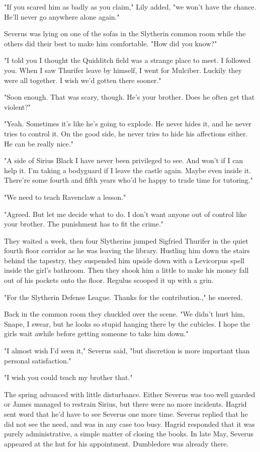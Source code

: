"If you scared him as badly as you claim," Lily added, "we won't have the chance. He'll never go anywhere alone again."

Severus was lying on one of the sofas in the Slytherin common room while the others did their best to make him comfortable. "How did you know?"

"I told you I thought the Quidditch field was a strange place to meet. I followed you. When I saw Thurifer leave by himself, I went for Mulciber. Luckily they were all together. I wish we'd gotten there sooner."

"Soon enough. That was scary, though. He's your brother. Does he often get that violent?"

"Yeah. Sometimes it's like he's going to explode. He never hides it, and he never tries to control it. On the good side, he never tries to hide his affections either. He can be really nice."

"A side of Sirius Black I have never been privileged to see. And won't if I can help it. I'm taking a bodyguard if I leave the castle again. Maybe even inside it. There're some fourth and fifth years who'd be happy to trade time for tutoring."

"We need to teach Ravenclaw a lesson."

"Agreed. But let me decide what to do. I don't want anyone out of control like your brother. The punishment has to fit the crime."

They waited a week, then four Slytherins jumped Sigfried Thurifer in the quiet fourth floor corridor as he was leaving the library. Hustling him down the stairs behind the tapestry, they suspended him upside down with a Levicorpus spell inside the girl's bathroom. Then they shook him a little to make his money fall out of his pockets onto the floor. Regulus scooped it up with a grin.

"For the Slytherin Defense League. Thanks for the contribution.," he sneered.

Back in the common room they chuckled over the scene. "We didn't hurt him, Snape, I swear, but he looks so stupid hanging there by the cubicles. I hope the girls wait awhile before getting someone to take him down."

"I almost wish I'd seen it," Severus said, "but discretion is more important than personal satisfaction."

"I wish you could teach my brother that."

The spring advanced with little disturbance. Either Severus was too well guarded or James managed to restrain Sirius, but there were no more incidents. Hagrid sent word that he'd have to see Severus one more time. Severus replied that he did not see the need, and was in any case too busy. Hagrid responded that it was purely administrative, a simple matter of closing the books. In late May, Severus appeared at the hut for his appointment. Dumbledore was already there.

